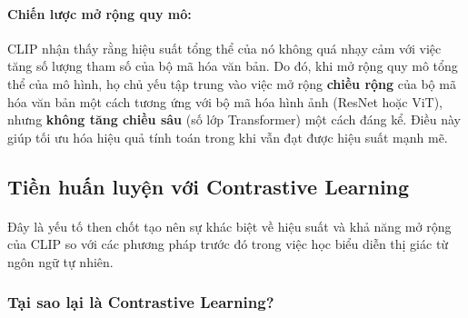 \paragraph{Chiến lược mở rộng quy mô:} CLIP nhận thấy rằng hiệu suất tổng thể của nó không quá nhạy cảm với việc tăng số lượng tham số của bộ mã hóa văn bản. Do đó, khi mở rộng quy mô tổng thể của mô hình, họ chủ yếu tập trung vào việc mở rộng \textbf{chiều rộng} của bộ mã hóa văn bản một cách tương ứng với bộ mã hóa hình ảnh (ResNet hoặc ViT), nhưng \textbf{không tăng chiều sâu} (số lớp Transformer) một cách đáng kể. Điều này giúp tối ưu hóa hiệu quả tính toán trong khi vẫn đạt được hiệu suất mạnh mẽ.

\subsection{Tiền huấn luyện với Contrastive Learning}
\label{subsec:contrastive_learning}
\paragraph{}{Đây là yếu tố then chốt tạo nên sự khác biệt về hiệu suất và khả năng mở rộng của CLIP so với các phương pháp trước đó trong việc học biểu diễn thị giác từ ngôn ngữ tự nhiên.}

\subsubsection{Tại sao lại là Contrastive Learning?}

